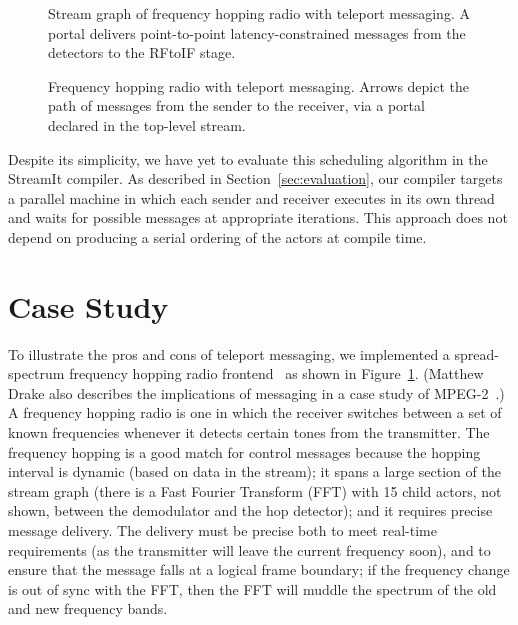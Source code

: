 \begin{figure}[t]
\centering
{}
\vspace{-6pt}
\caption[Stream graph of frequency hopping radio with teleport
  messaging.]{Stream graph of frequency hopping radio with teleport
  messaging.  A portal delivers point-to-point latency-constrained
  messages from the detectors to the RFtoIF
  stage.  \protect\label{fig:fhr-streamit}}
\vspace{-12pt}
\end{figure}

\begin{figure}[t]
\centering
\hspace{-0.2in}
\vspace{-6pt}
\caption[Code for frequency hopping radio with teleport
  messaging.]{Frequency hopping radio with teleport messaging.
  Arrows depict the path of messages from the sender to the receiver,
  via a portal declared in the top-level stream.
  \protect\label{fig:freq1}}
\vspace{-8pt}
\end{figure}

Despite its simplicity, we have yet to evaluate this scheduling
algorithm in the StreamIt compiler.  As described in
Section~\ref{sec:evaluation}, our compiler targets a parallel machine
in which each sender and receiver executes in its own thread and waits
for possible messages at appropriate iterations.  This approach does
not depend on producing a serial ordering of the actors at compile
time.

\section{Case Study}
\label{sec:casestudy}

To illustrate the pros and cons of teleport messaging, we implemented
a spread-spectrum frequency hopping radio frontend~\cite{harada02} as
shown in Figure~\ref{fig:fhr-streamit}.  (Matthew Drake also describes
the implications of messaging in a case study of
MPEG-2~\cite{ipdps2006,drake-thesis}.)  A frequency hopping radio is
one in which the receiver switches between a set of known frequencies
whenever it detects certain tones from the transmitter.  The frequency
hopping is a good match for control messages because the hopping
interval is dynamic (based on data in the stream); it spans a large
section of the stream graph (there is a Fast Fourier Transform (FFT)
with 15 child actors, not shown, between the demodulator and the hop
detector); and it requires precise message delivery.  The delivery
must be precise both to meet real-time requirements (as the
transmitter will leave the current frequency soon), and to ensure that
the message falls at a logical frame boundary; if the frequency change
is out of sync with the FFT, then the FFT will muddle the spectrum of
the old and new frequency bands.

